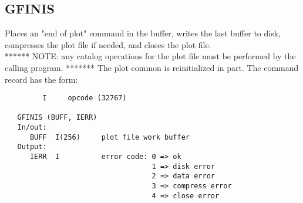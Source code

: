 \subsection{GFINIS}
Places an "end of plot" command in the buffer, writes the
last buffer to disk, compresses the plot file if needed, and
closes the plot file.\\
******  NOTE: any catalog operations for
the plot file must be performed by the calling program. *******
The plot common is reinitialized in part.
The command record has the form:
\begin{verbatim}
         I     opcode (32767)

   GFINIS (BUFF, IERR)
   In/out:
      BUFF  I(256)     plot file work buffer
   Output:
      IERR  I          error code: 0 => ok
                                   1 => disk error
                                   2 => data error
                                   3 => compress error
                                   4 => close error
\end{verbatim}

